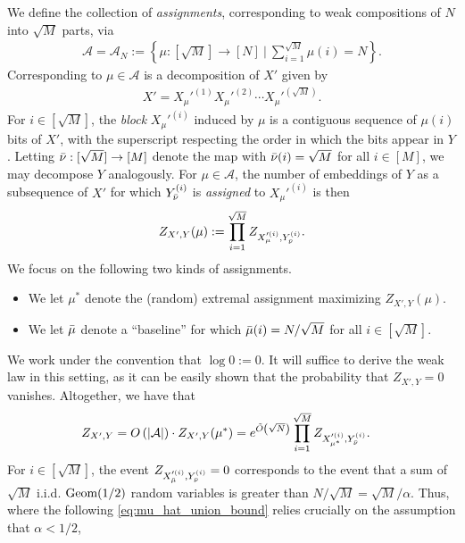 \documentclass[11pt]{amsart}
\numberwithin{equation}{section}
\numberwithin{equation}{section}
\newcommand{\1}{\mathbbm{1}}
\newcommand{\Geom}{\textup{Geom}}
\theoremstyle{definition}
\begin{document}
We define the collection of \emph{assignments}, corresponding to weak compositions of $N$ into $\sqrt{M}$ parts, via
\begin{align*}
    \mathcal A = \mathcal A_N := \left\{ \mu: [\sqrt{M}] \to [N] \ \Bigg| \  \sum_{i=1}^{\sqrt{M}} \mu(i) = N \right\}.
\end{align*}
Corresponding to $\mu \in \mathcal A$ is a decomposition of $X'$ given by
\begin{align*}
    X' = X_{\mu}'^{(1)}X_{\mu}'^{(2)}\cdots X_{\mu}'^{(\sqrt{M})}.
\end{align*}
For $i \in [\sqrt{M}]$, the \textit{block} $X_{\mu}'^{(i)}$ induced by $\mu$ is a contiguous sequence of $\mu(i)$ bits of $X'$, with the superscript respecting the order in which the bits appear in $Y$. Letting $\Bar{\nu}: [\sqrt{M}] \to [M]$ denote the map with $\Bar{\nu}(i) = \sqrt{M}$ for all $i \in [M]$, we may decompose $Y$ analogously. For $\mu \in \mathcal A$, the number of embeddings of $Y$ as a subsequence of $X'$ for which $Y_{\Bar{\nu}}^{(i)}$ is \textit{assigned} to $X_{\mu}'^{(i)}$ is then
\begin{align} \label{eq:mu_embeddings}
    Z_{X', Y}(\mu) := \prod_{i=1}^{\sqrt{M}} Z_{X_{\mu}'^{(i)}, Y_{\Bar{\nu}}^{(i)}}.
\end{align}
We focus on the following two kinds of assignments.
\begin{itemize}
    \item We let $\mu^*$ denote the (random) extremal assignment maximizing $Z_{X', Y}(\mu)$.
    \item We let $\Bar{\mu}$ denote a ``baseline'' for which $\Bar{\mu}(i) = N/\sqrt{M}$ for all $i \in [\sqrt{M}]$.
\end{itemize}
We work under the convention that $\log 0 := 0$. It will suffice to derive the weak law in this setting, as it can be easily shown that the probability that $Z_{X',Y} = 0$ vanishes. Altogether, we have that
\begin{align} \label{eq:Z_expression}
    Z_{X',Y} & = O\left( |\mathcal A| \right) \cdot Z_{X', Y}(\mu^*) = e^{\Tilde{O}\left(\sqrt{N} \right)} \prod_{i=1}^{\sqrt{M}} Z_{X_{\mu^*}'^{(i)}, Y_{\Bar{\nu}}^{(i)}}.
\end{align}
For $i \in [\sqrt{M}]$, the event $Z_{X_{\Bar{\mu}}'^{(i)}, Y_{\Bar{\nu}}^{(i)}} = 0$ corresponds to the event that a sum of $\sqrt{M}$ i.i.d. $\Geom(1/2)$ random variables is greater than $N/\sqrt{M} = \sqrt{M}/\alpha$. Thus, where the following \eqref{eq:mu_hat_union_bound} relies crucially on the assumption that $\alpha < 1/2$,
\end{document}
